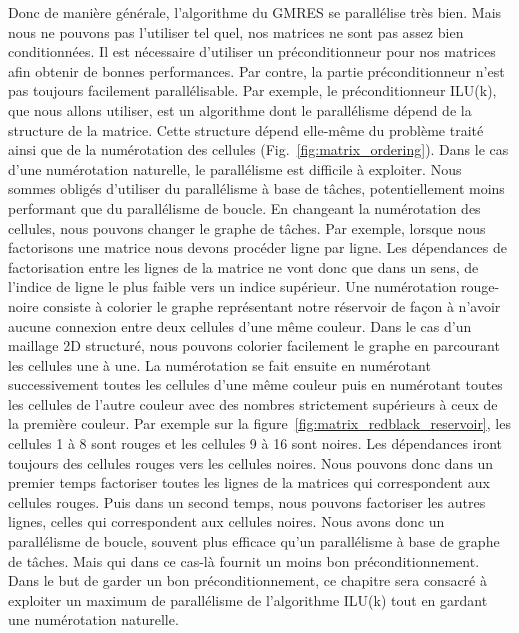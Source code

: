 Donc de manière générale, l'algorithme du GMRES se parallélise très bien.
%
Mais nous ne pouvons pas l'utiliser tel quel, nos matrices ne sont pas assez bien conditionnées.
%
Il est nécessaire d'utiliser un préconditionneur pour nos matrices afin obtenir de bonnes performances.
%
Par contre, la partie préconditionneur n'est pas toujours facilement parallélisable.
%
Par exemple, le préconditionneur ILU(k), que nous allons utiliser, est un algorithme dont le parallélisme dépend de la structure de la matrice.
%
Cette structure dépend elle-même du problème traité ainsi que de la numérotation des cellules (Fig.~\ref{fig:matrix_ordering}).
%
Dans le cas d'une numérotation naturelle, le parallélisme est difficile à exploiter.
%
Nous sommes obligés d'utiliser du parallélisme à base de tâches, potentiellement moins performant que du parallélisme de boucle.
%
En changeant la numérotation des cellules, nous pouvons changer le graphe de tâches.
%
Par exemple, lorsque nous factorisons une matrice nous devons procéder ligne par ligne.
%
Les dépendances de factorisation entre les lignes de la matrice ne vont donc que dans un sens, de l'indice de ligne le plus faible vers un indice supérieur.
%
Une numérotation rouge-noire consiste à colorier le graphe représentant notre réservoir de façon à n'avoir aucune connexion entre deux cellules d'une même couleur.
%
Dans le cas d'un maillage 2D structuré, nous pouvons colorier facilement le graphe en parcourant les cellules une à une.
%
La numérotation se fait ensuite en numérotant successivement toutes les cellules d'une même couleur puis en numérotant toutes les cellules de l'autre couleur avec des nombres strictement supérieurs à ceux de la première couleur.
%
Par exemple sur la figure~\ref{fig:matrix_redblack_reservoir}, les cellules 1 à 8 sont rouges et les cellules 9 à 16 sont noires.
%
Les dépendances iront toujours des cellules rouges vers les cellules noires.
%
Nous pouvons donc dans un premier temps factoriser toutes les lignes de la matrices qui correspondent aux cellules rouges.
%
Puis dans un second temps, nous pouvons factoriser les autres lignes, celles qui correspondent aux cellules noires.
%
Nous avons donc un parallélisme de boucle, souvent plus efficace qu'un parallélisme à base de graphe de tâches.
%
Mais qui dans ce cas-là fournit un moins bon préconditionnement\cite{red_black_ilu2}.
%
Dans le but de garder un bon préconditionnement, ce chapitre sera consacré à exploiter un maximum de parallélisme de l'algorithme ILU(k) tout en gardant une numérotation naturelle.

